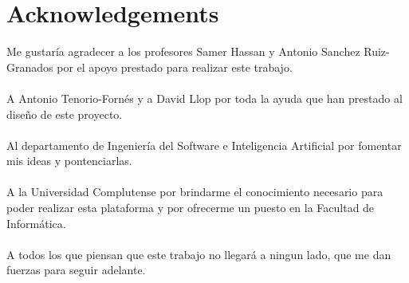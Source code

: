 \chapter{Acknowledgements}


Me gustaría agradecer a los profesores Samer Hassan y Antonio Sanchez
Ruiz-Granados por el apoyo prestado para realizar este trabajo.
\\
\mbox{}
\\
A Antonio Tenorio-Fornés y a David Llop por toda la ayuda que han prestado al
diseño de este proyecto.
\\
\mbox{}
\\
Al departamento de Ingeniería del Software e Inteligencia Artificial por
fomentar mis ideas y pontenciarlas.
\\
\mbox{}
\\
A la Universidad Complutense por brindarme el conocimiento necesario para poder
realizar esta plataforma y por ofrecerme un puesto en la Facultad de Informática.
\\
\mbox{}
\\
A todos los que piensan que este trabajo no llegará a ningun lado, que me dan
fuerzas para seguir adelante. \endinput

